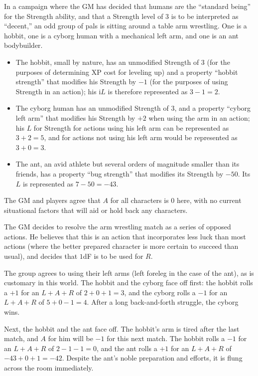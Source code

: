 \begin{example}
In a campaign where the GM has decided that humans are the ``standard being'' for the Strength ability,
and that a Strength level of 3 is to be interpreted as ``decent,'' an odd group of pals is sitting around a table arm wrestling.
One is a hobbit, one is a cyborg human with a mechanical left arm, and one is an ant bodybuilder.
\begin{itemize}
\item The hobbit, small by nature, has an unmodified Strength of $3$ (for the purposes of determining XP cost for leveling up) and a property
``hobbit strength'' that modifies his Strength by $-1$ (for the purposes of using Strength in an action); his i$L$ is therefore represented as $3-1=2$.
\item The cyborg human has an unmodified Strength of $3$, and a property ``cyborg left arm'' that modifies his Strength by $+2$ when using the arm in an action;
his $L$ for Strength for actions using his left arm can be represented as $3+2=5$, and for actions not using his left arm would be represented as $3+0=3$.
\item The ant, an avid athlete but several orders of magnitude smaller than its friends, has a property ``bug strength'' that modifies its Strength by $-50$.
Its $L$ is represented as $7-50=-43$.
\end{itemize}
The GM and players agree that $A$ for all characters is $0$ here, with no current situational factors that will aid or hold back any characters.

The GM decides to resolve the arm wrestling match as a series of opposed actions.
He believes that this is an action that incorporates less luck than most actions (where the better prepared character is more certain to succeed than usual),
and decides that $1$dF is to be used for $R$.

The group agrees to using their left arms (left foreleg in the case of the ant), as is customary in this world.
The hobbit and the cyborg face off first:
the hobbit rolls a $+1$ for an $L+A+R$ of $2+0+1=3$, and the cyborg rolls a $-1$ for an $L+A+R$ of $5+0-1=4$.
After a long back-and-forth struggle, the cyborg wins.

Next, the hobbit and the ant face off.
The hobbit’s arm is tired after the last match, and $A$ for him will be $-1$ for this next match.
The hobbit rolls a $-1$ for an $L+A+R$ of $2-1-1=0$, and the ant rolls a $+1$ for an $L+A+R$ of $-43+0+1=-42$.
Despite the ant’s noble preparation and efforts, it is flung across the room immediately.


\end{example}
